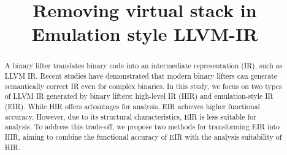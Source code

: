 \documentclass[sigplan,10pt]{acmart}
\begin{document}
\title{Removing virtual stack in Emulation style LLVM-IR}

%

\begin{abstract}
A binary lifter translates binary code into an intermediate representation
(IR), such as LLVM IR. Recent studies have demonstrated that modern binary
lifters can generate semantically correct IR even for complex binaries. In this
study, we focus on two types of LLVM IR generated by binary lifters: high-level
IR (HIR) and emulation-style IR (EIR). While HIR offers advantages for
analysis, EIR achieves higher functional accuracy. However, due to its
structural characteristics, EIR is less suitable for analysis. To address this
trade-off, we propose two methods for transforming EIR into HIR, aiming to
combine the functional accuracy of EIR with the analysis suitability of HIR.
\end{abstract}

\maketitle








\end{document}
